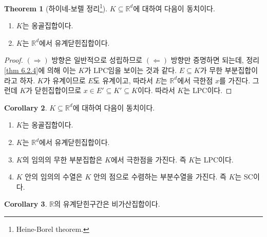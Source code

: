 \documentclass[11pt]{book}
\numberwithin{equation}{chapter}
\def\RR{\mathbb{R}}
\theoremstyle{definition}
\newtheorem{thm}{Theorem}[section]
\newtheorem{cor}[thm]{Corollary}
\newenvironment{enum}
	{\begin{enumerate}[label=(\alph*), leftmargin=2\parindent]}
	{\end{enumerate}}
\begin{document}
\begin{thm}[하이네-보렐 정리\footnote{Heine-Borel theorem.}]
    \(K \subseteq \RR^d\)에 대하여 다음이 동치이다.
    \begin{enum}
        \item \(K\)는 옹골집합이다.
        \item \(K\)는 \(\RR^d\)에서 유계닫힌집합이다.
    \end{enum}
\end{thm}
\begin{proof}
    \((\Rightarrow)\) 방향은 일반적으로 성립하므로 \((\Leftarrow)\) 방향만 증명하면 되는데, 정리 \ref{thm 6.2.4}에 의해 이는 \(K\)가 LPC임을 보이는 것과 같다. \(E \subseteq K\)가 무한 부분집합이라고 하자. \(K\)가 유계이므로 \(E\)도 유계이고, 따라서 \(E\)는 \(\RR^d\)에서 극한점 \(x\)를 가진다. 그런데 \(K\)가 닫힌집합이므로 \(x \in E' \subseteq K' \subseteq K\)이다. 따라서 \(K\)는 LPC이다.
\end{proof}

\begin{cor}
    \(K \subseteq \RR^d\)에 대하여 다음이 동치이다.
    \begin{enum}
        \item \(K\)는 옹골집합이다.
        \item \(K\)는 \(\RR^d\)에서 유계닫힌집합이다.
        \item \(K\)의 임의의 무한 부분집합은 \(K\)에서 극한점을 가진다. 즉 \(K\)는 LPC이다.
        \item \(K\) 안의 임의의 수열은 \(K\) 안의 점으로 수렴하는 부분수열을 가진다. 즉 \(K\)는 SC이다.
    \end{enum}
\end{cor}

\begin{cor}
    \(\RR\)의 유계닫힌구간은 비가산집합이다.
\end{cor}
\end{document}

